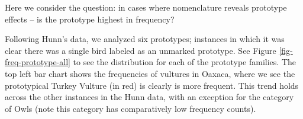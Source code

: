 \documentclass[10pt,letterpaper]{article}
\begin{document}

Here we consider the question: in cases where nomenclature reveals prototype effects -- is the prototype highest in frequency?

Following Hunn's data\cite{hunn2008zapotec}, we analyzed six prototypes; instances in which it was clear there was a single bird labeled as an unmarked prototype. See Figure \ref{fig-freq-prototype-all} to see the distribution for each of the prototype families. The top left bar chart shows the frequencies of vultures in Oaxaca, where we see the prototypical Turkey Vulture (in red) is clearly is more frequent. This trend holds across the other instances in the Hunn data, with an exception for the category of Owls (note this category has comparatively low frequency counts).






\end{document}
